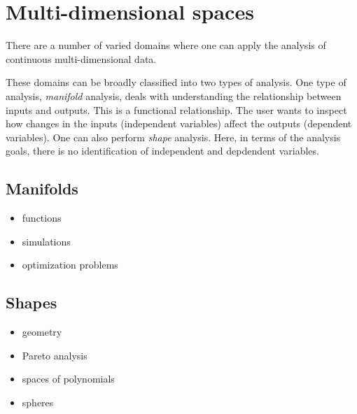 \section{Multi-dimensional spaces}
\label{multi-dimensional-spaces}

There are a number of varied domains where one can apply the analysis of
continuous multi-dimensional data.



These domains can be broadly classified into two types of analysis.  One type
of analysis, \emph{manifold} analysis, deals with understanding the
relationship between inputs and outputs. This is a functional relationship.
The user wants to inspect how changes in the inputs (independent variables)
affect the outputs (dependent variables). One can also perform \emph{shape}
analysis. Here, in terms of the analysis goals, there is no identification of 
independent and depdendent variables. 

\subsection{Manifolds}
\label{sec:manifolds}

    \begin{itemize}
    \item
      functions
    \item
      simulations
    \item
      optimization problems
    \end{itemize}

\subsection{Shapes}
\label{sec:shapes}

    \begin{itemize}
    \item
      geometry
    \item
      Pareto analysis
    \item
      spaces of polynomials
    \item
      spheres
    \end{itemize}

